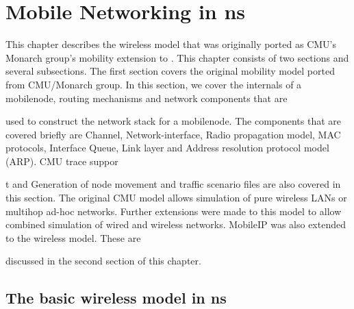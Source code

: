 %
\chapter{Mobile Networking in ns}
\label{chap:mobility}

This chapter describes the wireless model that was originally ported as CMU's Monarch group's mobility extension to \ns. 
This chapter consists of two sections and several subsections. The first section covers the original mobility model ported from CMU/Monarch group. In this section, we cover the internals of a mobilenode, routing mechanisms and network components that are 











used to construct the network stack for a mobilenode. The components that are covered briefly are Channel, Network-interface, Radio propagation model, MAC protocols, Interface Queue, Link layer and Address resolution protocol model (ARP). CMU trace suppor











t and Generation of node movement and traffic scenario files are also covered in this section.
The original CMU model allows simulation of pure wireless LANs or multihop ad-hoc networks. Further extensions were made to this model to allow combined simulation of wired and wireless networks. MobileIP was also extended to the wireless model. These are











 discussed in the second section of this chapter.		


\section{The basic wireless model in ns}
\label{sec:basic-model}


